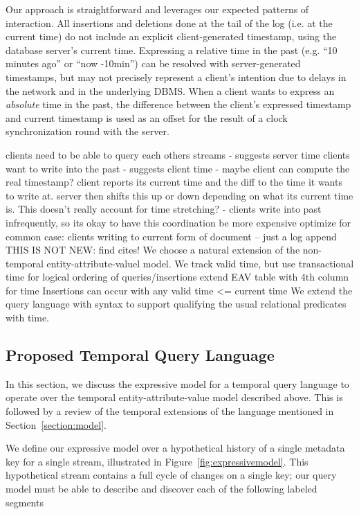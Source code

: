 Our approach is straightforward and leverages our expected patterns of interaction.
All insertions and deletions done at the tail of the log (i.e. at the current time)
do not include an explicit client-generated timestamp, using the database server's current
time. Expressing a relative time in the past (e.g. ``10 minutes ago'' or ``now -10min'')
can be resolved with server-generated timestamps, but may not precisely represent
a client's intention due to delays in the network and in the underlying DBMS.
When a client wants to express an \emph{absolute} time in the past, the difference
between the client's expressed timestamp and current timestamp is used as an offset
for the result of a clock synchronization round with the server.

clients need to be able to query each others streams
    - suggests server time
clients want to write into the past
    - suggests client time
    - maybe client can compute the real timestamp?
        client reports its current time and the diff to the time it wants to write at.
        server then shifts this up or down depending on what its current time is.
        This doesn't really account for time stretching?
    - clients write into past infrequently, so its okay to have this coordination be more expensive
optimize for common case: clients writing to current form of document -- just a log append
\fi
{}
THIS IS NOT NEW: find cites!
We choose a natural extension of the non-temporal entity-attribute-valuel model.
We track valid time, but use transactional time for logical ordering of queries/insertions
extend EAV table with 4th column for time
Insertions can occur with any valid time <= current time
We extend the query language with syntax to support qualifying the usual
relational predicates with time.
\fi

\subsection{Proposed Temporal Query Language}

In this section, we discuss the expressive model for a temporal query language to operate
over the temporal entity-attribute-value model described above. This is followed by a review
of the temporal extensions of the language mentioned in Section~\ref{section:model}.

We define our expressive model over a hypothetical history of a single metadata key for a single stream, illustrated
in Figure~\ref{fig:expressivemodel}. This hypothetical stream contains a full cycle of changes on a single key; our query
model must be able to describe and discover each of the following labeled segments

